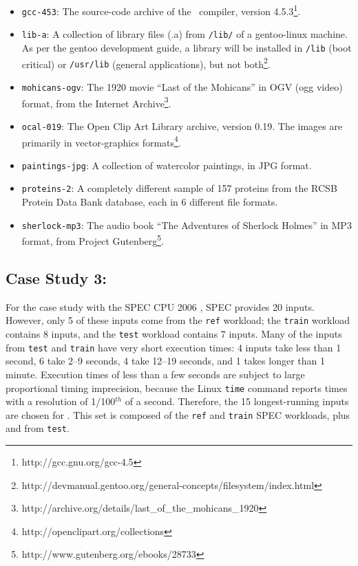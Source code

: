 {\begin{itemize}
\item {\tt gcc-453}: The source-code archive of the \gcc\ compiler, version 4.5.3\footnote{http://gcc.gnu.org/gcc-4.5}.

\item {\tt lib-a}: A collection of library files (.a) from {\tt /lib/} of a gentoo-linux machine.  As per the gentoo development guide, a library will be installed in {\tt /lib} (boot critical) or {\tt /usr/lib} (general applications), but not both\footnote{http://devmanual.gentoo.org/general-concepts/filesystem/index.html}.

\item {\tt mohicans-ogv}: The 1920 movie ``Last of the Mohicans'' in OGV (ogg video) format, from the Internet Archive\footnote{http://archive.org/details/last\_of\_the\_mohicans\_1920}.

\item {\tt ocal-019}: The Open Clip Art Library archive, version 0.19. The images are primarily in vector-graphics formats\footnote{http://openclipart.org/collections}.

\item {\tt paintings-jpg}: A collection of watercolor paintings, in JPG format.

\item {\tt proteins-2}: A completely different sample of 157 proteins from the RCSB Protein Data Bank database, each in 6 different file formats.

\item {\tt sherlock-mp3}: The audio book ``The Adventures of Sherlock Holmes'' in MP3 format, from Project Gutenberg\footnote{http://www.gutenberg.org/ebooks/28733}.

\end{itemize}
}

\subsection {Case Study 3: \gobmk}

For the case study with the SPEC CPU 2006 \gobmk, SPEC provides 20 inputs.  However, only 5 of these inputs come from the {\tt ref} workload; the {\tt train} workload contains 8 inputs, and the {\tt test} workload contains 7 inputs.  Many of the inputs from {\tt test} and {\tt train} have very short execution times: 4 inputs take less than 1 second, 6 take 2--9 seconds, 4 take 12--19 seconds, and 1 takes longer than 1 minute.  Execution times of less than a few seconds are subject to large proportional timing imprecision, because the Linux {\tt time} command reports times with a resolution of 1/100$^{th}$ of a second.  Therefore, the 15 longest-running inputs are chosen for \Wfull.  This set is composed of the {\tt ref} and {\tt train} SPEC workloads, plus  and  from {\tt test}.

